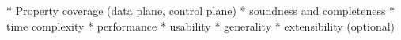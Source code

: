 
* Property coverage (data plane, control plane)
* soundness and completeness
* time complexity
* performance
* usability
* generality
* extensibility (optional)

